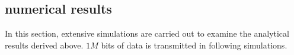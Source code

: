 \subsection{numerical results}
In this section, extensive simulations are carried out to
examine the analytical results derived above.
$1M$ bits of data is transmitted in following simulations. 